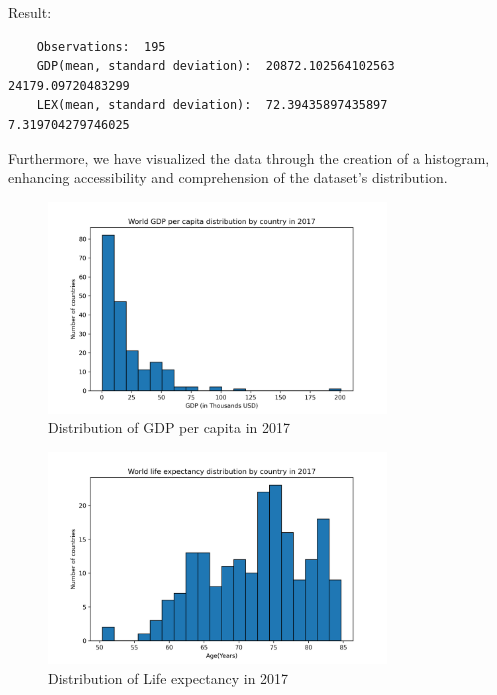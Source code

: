 Result:
\begin{verbatim}
    Observations:  195
    GDP(mean, standard deviation):  20872.102564102563 24179.09720483299
    LEX(mean, standard deviation):  72.39435897435897 7.319704279746025
\end{verbatim}


Furthermore, we have visualized the data through the creation of a histogram, enhancing accessibility and comprehension of the dataset's distribution.
\begin{figure}[hbpt]
    \centering
    \includegraphics[width=0.8\textwidth]{figures/gdp_histo.png}
    \caption{Distribution of GDP per capita in 2017}
    \label{fig:gdp-dis}
\end{figure}
\newpage
\begin{figure}[t]
    \centering
    \includegraphics[width=0.8\textwidth]{figures/lex_histo.png}
    \caption{Distribution of Life expectancy in 2017}
    \label{fig:lex-dis}
\end{figure}
